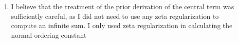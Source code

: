 \documentclass[11pt, class=article, crop=false]{standalone}
\begin{document}
\begin{enumerate}
	 
	 \item 
	 I believe that the treatment of the prior derivation of the central term was sufficiently careful, as I did not need to use any zeta regularization to compute an infinite sum. I only used zeta regularization in calculating the normal-ordering constant
%

\end{enumerate}
\end{document}
